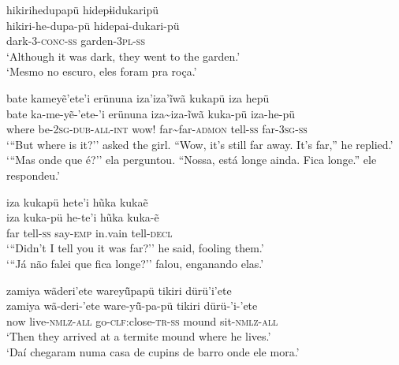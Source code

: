 \documentclass[output=paper,
modfonts,nonflat
]{langsci/langscibook}
\begin{document}


\ea   hikirihedupapü hidepɨidukaripü \\[.3em]
\gll hikiri-he-dupa-pü hidepai-dukari-pü \\
dark-\textsc{3-conc-ss} garden-\textsc{3pl-ss}\\
\glt `Although it was dark, they went to the garden.' \\
`Mesmo no escuro, eles foram pra roça.'
\z


\ea   bate kameyẽ'ete'i erünuna iza'iza'ĩwã  kukapü iza hepü \\[.3em]
\gll bate ka-me-yẽ-'ete-'i erünuna iza\textasciitilde iza-ĩwã  kuka-pü iza-he-pü \\
where be-\textsc{2sg-dub-all-int} wow! far\textasciitilde far-\textsc{admon} tell-\textsc{ss} far-\textsc{3sg-ss}\\
\glt    `{``}But where is it?'' asked the girl. ``Wow, it's still far away. It's far,'' he replied.' \\
`{``}Mas onde que é?'' ela perguntou. ``Nossa, está longe ainda. Fica longe.'' ele respondeu.'
\z

\ea   iza kukapü hete'i hũka kukaẽ   \\[.3em]
\gll  iza kuka-pü he-te'i hũka kuka-ẽ \\
far tell-\textsc{ss} say-\textsc{emp} in.vain tell-\textsc{decl}\\
\glt   `{``}Didn't I tell you it was far?'' he said, fooling them.'\\ 
`{``}Já não falei que fica longe?'' falou, enganando elas.' \\
\z

\ea   zamiya wãderi'ete wareyü̃papü tikiri dürü'i'ete \\[.3em]
\gll zamiya wã-deri-'ete ware-yü̃-pa-pü tikiri dürü-'i-'ete\\
now live-\textsc{nmlz-all} go-\textsc{clf:}close-\textsc{tr-ss} mound sit-\textsc{nmlz-all} \\
\glt   `Then they arrived at a termite mound where he lives.' \\
 `Daí chegaram numa casa de cupins de barro onde ele mora.'\\
\z
 
\end{document}
